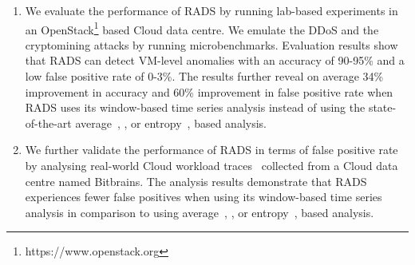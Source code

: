 \begin{enumerate}[{(1)}]
\item We evaluate the performance of RADS by running lab-based experiments in an OpenStack\footnote{https://www.openstack.org} based Cloud data centre. We emulate the DDoS and the cryptomining attacks by running microbenchmarks. Evaluation results show that RADS can detect VM-level anomalies with an accuracy of 90-95\% and a low false positive rate of 0-3\%. The results further reveal on average 34\% improvement in accuracy and 60\% improvement in false positive rate when RADS uses its window-based time series analysis instead of using the state-of-the-art average~\cite{automated-detection:2016}, \cite{UBL:2012}, \cite{cloud-malware:2016} or entropy~\cite{EbAT:2010}, \cite{entorpy_based_detection_2:2014} based analysis. 
\item We further validate the performance of RADS in terms of false positive rate by analysing real-world Cloud workload traces~\cite{workloadCCGRID:2015} collected from a Cloud data centre named Bitbrains. The analysis results demonstrate that RADS experiences fewer false positives when using its window-based time series analysis in comparison to using average~\cite{automated-detection:2016}, \cite{UBL:2012}, \cite{cloud-malware:2016} or entropy~\cite{EbAT:2010}, \cite{entorpy_based_detection_2:2014} based analysis.
\end{enumerate}

